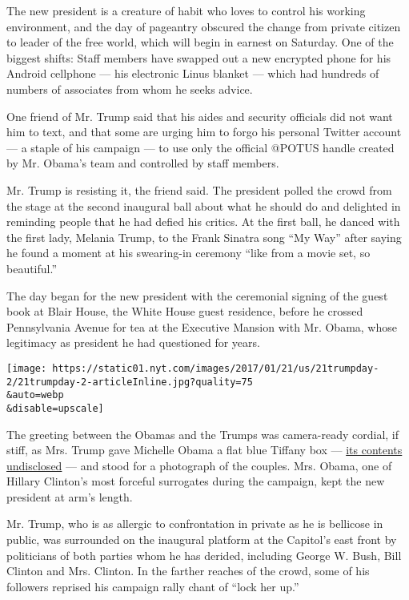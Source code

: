 The new president is a creature of habit who loves to control his
working environment, and the day of pageantry obscured the change from
private citizen to leader of the free world, which will begin in earnest
on Saturday. One of the biggest shifts: Staff members have swapped out a
new encrypted phone for his Android cellphone --- his electronic Linus
blanket --- which had hundreds of numbers of associates from whom he
seeks advice.

One friend of Mr. Trump said that his aides and security officials did
not want him to text, and that some are urging him to forgo his personal
Twitter account --- a staple of his campaign --- to use only the
official @POTUS handle created by Mr. Obama's team and controlled by
staff members.

Mr. Trump is resisting it, the friend said. The president polled the
crowd from the stage at the second inaugural ball about what he should
do and delighted in reminding people that he had defied his critics. At
the first ball, he danced with the first lady, Melania Trump, to the
Frank Sinatra song ``My Way'' after saying he found a moment at his
swearing-in ceremony ``like from a movie set, so beautiful.''

The day began for the new president with the ceremonial signing of the
guest book at Blair House, the White House guest residence, before he
crossed Pennsylvania Avenue for tea at the Executive Mansion with Mr.
Obama, whose legitimacy as president he had questioned for years.

\texttt{[image: https://static01.nyt.com/images/2017/01/21/us/21trumpday-2/21trumpday-2-articleInline.jpg?quality=75\\\&auto=webp\\\&disable=upscale]}

The greeting between the Obamas and the Trumps was camera-ready cordial,
if stiff, as Mrs. Trump gave Michelle Obama a flat blue Tiffany box ---
\href{https://www.nytimes.com/2017/01/20/us/politics/tiffany-melania-trump-michelle-obama.html}{its
contents undisclosed} --- and stood for a photograph of the couples.
Mrs. Obama, one of Hillary Clinton's most forceful surrogates during the
campaign, kept the new president at arm's length.

Mr. Trump, who is as allergic to confrontation in private as he is
bellicose in public, was surrounded on the inaugural platform at the
Capitol's east front by politicians of both parties whom he has derided,
including George W. Bush, Bill Clinton and Mrs. Clinton. In the farther
reaches of the crowd, some of his followers reprised his campaign rally
chant of ``lock her up.''

